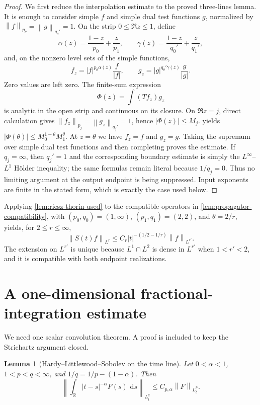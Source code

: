\documentclass[11pt,oneside]{book}
\newtheorem{lemma}[theorem]{Lemma}
\theoremstyle{definition}
\theoremstyle{remark}
\newcommand{\R}{\mathbb R}
\newcommand{\1}{\mathbf 1}
\newcommand{\dd}{\,\mathrm d}
\newcommand{\norm}[1]{\left\lVert #1\right\rVert}
\begin{document}
\begin{proof}
We first reduce the interpolation estimate to the proved three-lines lemma.  It is enough to
consider simple $f$ and simple dual test functions $g$, normalized by
$\norm f_{p_\theta}=\norm g_{q_\theta'}=1$.  On the strip
$0\le\Re z\le1$, define
\[
 \alpha(z)=\frac{1-z}{p_0}+\frac z{p_1},
 \qquad
 \gamma(z)=\frac{1-z}{q_0'}+\frac z{q_1'},
\]
and, on the nonzero level sets of the simple functions,
\[
 f_z=|f|^{p_\theta\alpha(z)}\frac f{|f|},
 \qquad
 g_z=|g|^{q_\theta'\gamma(z)}\frac g{|g|}.
\]
Zero values are left zero.  The finite-sum expression
\[
 \Phi(z)=\int (Tf_z)g_z
\]
is analytic in the open strip and continuous on its closure.  On
$\Re z=j$, direct calculation gives
$\norm{f_z}_{p_j}=\norm{g_z}_{q_j'}=1$, hence
$|\Phi(z)|\le M_j$.   yields
$|\Phi(\theta)|\le M_0^{1-\theta}M_1^\theta$.  At $z=\theta$ we have
$f_z=f$ and $g_z=g$.  Taking the supremum over simple dual test functions and then completing
proves the estimate.  If $q_j=\infty$, then $q_j'=1$ and the corresponding
boundary estimate is simply the $L^\infty$--$L^1$ H\"older inequality; the
same formulas remain literal because $1/q_j=0$.  Thus no limiting argument
at the output endpoint is being suppressed.  Input exponents are finite in
the stated form, which is exactly the case used below.
\end{proof}

Applying \cref{lem:riesz-thorin-used} to the compatible operators in
\cref{lem:propagator-compatibility}, with
$(p_0,q_0)=(1,\infty)$, $(p_1,q_1)=(2,2)$, and
$\theta=2/r$, yields, for $2\le r\le\infty$,
\begin{equation}
 \norm{S(t)f}_{L^r}
 \le C_r|t|^{-(1/2-1/r)}\norm f_{L^{r'}}.
 \label{eq:disp-interp}
\end{equation}
The extension on $L^{r'}$ is unique because $L^1\cap L^2$ is dense in
$L^{r'}$ when $1<r'<2$, and it is compatible with both endpoint
realizations.

\section{A one-dimensional fractional-integration estimate}
We need one scalar convolution theorem.  A proof is included to keep the
Strichartz argument closed.

\begin{lemma}[Hardy--Littlewood--Sobolev on the time line]\label{lem:HLS-time}
Let $0<\alpha<1$, $1<p<q<\infty$, and
$1/q=1/p-(1-\alpha)$.  Then
\[
 \left\|\int_\R |t-s|^{-\alpha}F(s)\,\dd s\right\|_{L^q_t}
 \le C_{p,\alpha}\norm F_{L^p_t}.
\]
\end{lemma}
\end{document}
